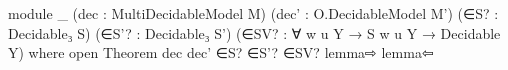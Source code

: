 \begin{spverbatim}
  module _
    (dec : MultiDecidableModel M)
    (dec' : O.DecidableModel M')
    (∈S? : Decidable₃ S)
    (∈S'? : Decidable₃ S')
    (∈SV? : ∀ {w u Y} → S w u Y → Decidable Y)
    where
    open Theorem dec dec' ∈S? ∈S'? ∈SV? lemma⇨ lemma⇦
\end{spverbatim}
